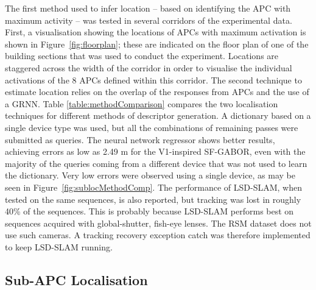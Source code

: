 The first method used to infer location -- based on identifying the APC with maximum activity -- was tested in several corridors of the experimental data.  First, a visualisation showing the locations of APCs with maximum activation is shown in Figure~\ref{fig:floorplan}; these are indicated on the floor plan of one of the building sections that was used to conduct the experiment.  Locations are staggered across the width of the corridor in order to visualise the individual activations of the 8 APCs defined within this corridor. The second technique to estimate location relies on the overlap of the responses from APCs and the use of a GRNN. Table \ref{table:methodComparison} compares the two localisation techniques for different methods of descriptor generation. A dictionary based on a single device type was used, but all the combinations of remaining passes were submitted as queries. The neural network regressor shows better results, achieving errors as low as 2.49 m for the V1-inspired SF-GABOR, even with the majority of the queries coming from a different device that was not used to learn the dictionary. Very low errors were observed using a single device, as may be seen in Figure~\ref{fig:sublocMethodComp}. The performance of LSD-SLAM, when tested on the same sequences, is also reported, but tracking was lost in roughly 40\% of the sequences. This is probably because LSD-SLAM performs best on sequences acquired with global-shutter, fish-eye lenses. The RSM dataset does not use such cameras. A tracking recovery exception catch was therefore implemented to keep LSD-SLAM running. 







\subsection{Sub-APC Localisation}


